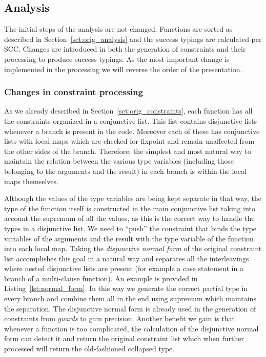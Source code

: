 \subsection{Analysis}
\label{sct:intersection_analysis}

The initial steps of the analysis are not changed. Functions are
sorted as described in Section~\ref{sct:orig_analysis} and the success
typings are calculated per SCC. Changes are introduced in both the
generation of constraints and their processing to produce success
typings. As the most important change is implemented in the processing
we will reverse the order of the presentation.

\subsubsection{Changes in constraint processing}
\label{sct:intersect_constr_process}

As we already described in Section~\ref{sct:orig_constraints}, each
function has all the constraints organized in a conjunctive list. This
list contains disjunctive lists whenever a branch is present in the
code. Moreover each of these has conjunctive lists with local maps
which are checked for fixpoint and remain unaffected from the other
sides of the branch. Therefore, the simplest and most natural way to
maintain the relation between the various type variables (including
those belonging to the arguments and the result) in each branch is
within the local maps themselves.

Although the values of the type variables are being kept separate in
that way, the type of the function itself is constructed in the main
conjunctive list taking into account the supremum of all the values,
as this is the correct way to handle the types in a disjunctive
list. We need to ``push'' the constraint that binds the type variables
of the arguments and the result with the type variable of the function
into each local map. Taking the \emph{disjunctive normal form} of the
original constraint list accomplishes this goal in a natural way and
separates all the interleavings where nested disjunctive lists are
present (for example a case statement in a branch of a multi-clause
function). An example is provided in Listing~\ref{lst:normal_form}. In
this way we generate the correct partial type in every branch and
combine them all in the end using supremum which maintains the
separation. The disjunctive normal form is already used in the
generation of constraints from \emph{guards} to gain precision.
Another benefit we gain is that whenever a function is too
complicated, the calculation of the disjunctive normal form can detect
it and return the original constraint list which when further
processed will return the old-fashioned collapsed type.

